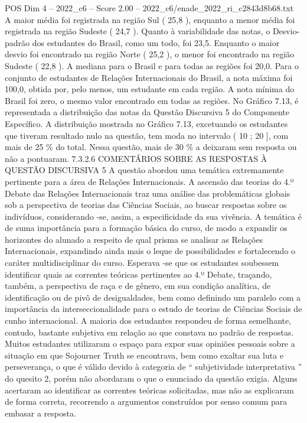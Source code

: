 \begin{textsample}{POS Dim 4 – 2022\_c6 – Score 2.00 – 2022\_c6/enade\_2022\_ri\_c2843d8b68.txt}
A maior média foi registrada na região Sul ( 25,8 ), enquanto a menor média foi registrada na região Sudeste ( 24,7 ).
Quanto à variabilidade das notas, o Desvio-padrão dos estudantes do Brasil, como um todo, foi 23,5.
Enquanto o maior desvio foi encontrado na região Norte ( 25,2 ), o menor foi encontrado na região Sudeste ( 22,8 ).
A mediana para o Brasil e para todas as regiões foi 20,0.
Para o conjunto de estudantes de Relações Internacionais do Brasil, a nota máxima foi 100,0, obtida por, pelo menos, um estudante em cada região.
A nota mínima do Brasil foi zero, o mesmo valor encontrado em todas as regiões.
No Gráfico 7.13, é representada a distribuição das notas da Questão Discursiva 5 do Componente Específico.
A distribuição mostrada no Gráfico 7.13, excetuando os estudantes que tiveram resultado nulo na questão, tem moda no intervalo ( 10 ; 20 ], com mais de 25 \% do total.
Nessa questão, mais de 30 \% a deixaram sem resposta ou não a pontuaram. 7.3.2.6 COMENTÁRIOS SOBRE AS RESPOSTAS À QUESTÃO DISCURSIVA 5 A questão abordou uma temática extremamente pertinente para a área de Relações Internacionais.
A ascensão das teorias do 4.º Debate das Relações Internacionais traz uma análise das problemáticas globais sob a perspectiva de teorias das Ciências Sociais, ao buscar respostas sobre os indivíduos, considerando -se, assim, a especificidade da sua vivência.
A temática é de suma importância para a formação básica do curso, de modo a expandir os horizontes do alunado a respeito de qual prisma se analisar as Relações Internacionais, expandindo ainda mais o leque de possibilidades e fortalecendo o caráter multidisciplinar do curso.
Esperava -se que os estudantes soubessem identificar quais as correntes teóricas pertinentes ao 4.º Debate, traçando, também, a perspectiva de raça e de gênero, em sua condição analítica, de identificação ou de pivô de desigualdades, bem como definindo um paralelo com a importância da interseccionalidade para o estudo de teorias de Ciências Sociais de cunho internacional.
A maioria dos estudantes respondeu de forma semelhante, contudo, bastante subjetiva em relação ao que constava no padrão de respostas.
Muitos estudantes utilizaram o espaço para expor suas opiniões pessoais sobre a situação em que Sojourner Truth se encontrava, bem como exaltar sua luta e perseverança, o que é válido devido à categoria de “ subjetividade interpretativa ” do quesito 2, porém não abordaram o que o enunciado da questão exigia.
Alguns acertaram ao identificar as correntes teóricas solicitadas, mas não as explicaram de forma correta, recorrendo a argumentos construídos por senso comum para embasar a resposta.

\end{textsample}
